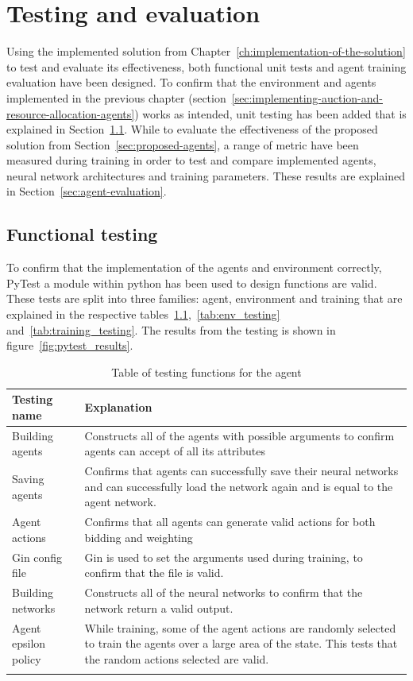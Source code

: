 
\chapter{Testing and evaluation}\label{ch:testing-and-evaluation}
Using the implemented solution from Chapter~\ref{ch:implementation-of-the-solution} to test and evaluate its
effectiveness, both functional unit tests and agent training evaluation have been designed. To confirm that the
environment and agents implemented in the previous chapter
(section~\ref{sec:implementing-auction-and-resource-allocation-agents}) works as intended, unit testing has been added
that is explained in Section~\ref{sec:functional-testing}. While to evaluate the effectiveness of the proposed
solution from Section~\ref{sec:proposed-agents}, a range of metric have been measured during training in order to
test and compare implemented agents, neural network architectures and training parameters. These results are explained
in Section~\ref{sec:agent-evaluation}.

\section{Functional testing}\label{sec:functional-testing}
To confirm that the implementation of the agents and environment correctly, PyTest a module within python has been used
to design functions are valid. These tests are split into three families: agent, environment and training that are
explained in the respective tables~\ref{tab:agent_testing},~\ref{tab:env_testing} and~\ref{tab:training_testing}.
The results from the testing is shown in figure~\ref{fig:pytest_results}.

\begin{longtable}{|p{3cm}|p{11cm}|} \hline
    \textbf{Testing name} & \textbf{Explanation} \\ \hline
    Building agents & Constructs all of the agents with possible arguments to confirm agents can accept of all its
        attributes\\ \hline
    Saving agents & Confirms that agents can successfully save their neural networks and can successfully load
        the network again and is equal to the agent network. \\ \hline
    Agent actions & Confirms that all agents can generate valid actions for both bidding and weighting \\ \hline
    Gin config file & Gin is used to set the arguments used during training, to confirm that the file is valid. \\ \hline
    Building networks & Constructs all of the neural networks to confirm that the network return a valid output. \\ \hline
    Agent epsilon policy & While training, some of the agent actions are randomly selected to train the agents over
        a large area of the state. This tests that the random actions selected are valid. \\ \hline
    \caption{Table of testing functions for the agent}
    \label{tab:agent_testing}
\end{longtable}

